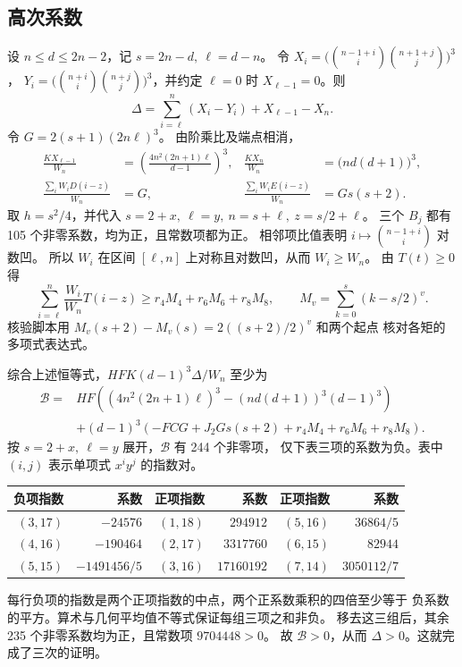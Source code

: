 \documentclass[11pt,UTF8,fontset=fandol]{ctexart}
\begin{document}
\subsection{高次系数}

设 \(n\le d\le 2n-2\)，记 \(s=2n-d,\ \ell=d-n\)。
令 \(X_i=\bigl(\binom{n-1+i}{i}\binom{n+1+j}{j}\bigr)^3\)，
\(Y_i=\bigl(\binom{n+i}{i}\binom{n+j}{j}\bigr)^3\)，并约定
\(\ell=0\) 时 \(X_{\ell-1}=0\)。则
\[
 \Delta=\sum_{i=\ell}^n(X_i-Y_i)+X_{\ell-1}-X_n .
\]
令 \(G=2(s+1)(2n\ell)^3\)。
由阶乘比及端点相消，
\begin{align*}
 \frac{K X_{\ell-1}}{W_n}&=\left(\frac{4n^2(2n+1)\ell}{d-1}\right)^3,&
 \frac{K X_n}{W_n}&=\bigl(nd(d+1)\bigr)^3,\\
 \frac{\sum_i W_iD(i-z)}{W_n}&=G,&
 \frac{\sum_i W_iE(i-z)}{W_n}&=Gs(s+2).
\end{align*}
取 \(h=s^2/4\)，并代入 \(s=2+x,\ \ell=y,\ n=s+\ell,\ z=s/2+\ell\)。
三个 \(B_j\) 都有 105 个非零系数，均为正，且常数项都为正。
相邻项比值表明 \(i\mapsto\binom{n-1+i}{i}\) 对数凹。
所以 \(W_i\) 在区间 \([\ell,n]\) 上对称且对数凹，从而 \(W_i\ge W_n\)。
由 \(T(t)\ge0\) 得
\[
 \sum_{i=\ell}^n \frac{W_i}{W_n}T(i-z)\ge r_4M_4+r_6M_6+r_8M_8,
 \qquad M_v=\sum_{k=0}^s(k-s/2)^v .
\]
核验脚本用 \(M_v(s+2)-M_v(s)=2((s+2)/2)^v\) 和两个起点
核对各矩的多项式表达式。

综合上述恒等式，\(HFK(d-1)^3\Delta/W_n\) 至少为
\begin{align*}
 \mathcal B={}&HF\left((4n^2(2n+1)\ell)^3-(nd(d+1))^3(d-1)^3\right)\\
 &+(d-1)^3\left(-FCG+J_2Gs(s+2)+r_4M_4+r_6M_6+r_8M_8\right).
\end{align*}
按 \(s=2+x,\ \ell=y\) 展开，\(\mathcal B\) 有 244 个非零项，
仅下表三项的系数为负。表中 \((i,j)\) 表示单项式 \(x^iy^j\) 的指数对。

\begin{center}
\begin{tabular}{rrrrrr}
\toprule
负项指数 & 系数 & 正项指数 & 系数 & 正项指数 & 系数\\
\midrule
\((3,17)\)&\(-24576\)&\((1,18)\)&\(294912\)&\((5,16)\)&\(36864/5\)\\
\((4,16)\)&\(-190464\)&\((2,17)\)&\(3317760\)&\((6,15)\)&\(82944\)\\
\((5,15)\)&\(-1491456/5\)&\((3,16)\)&\(17160192\)&\((7,14)\)&\(3050112/7\)\\
\bottomrule
\end{tabular}
\end{center}

每行负项的指数是两个正项指数的中点，两个正系数乘积的四倍至少等于
负系数的平方。算术与几何平均值不等式保证每组三项之和非负。
移去这三组后，其余 235 个非零系数均为正，且常数项 \(9704448>0\)。
故 \(\mathcal B>0\)，从而 \(\Delta>0\)。这就完成了三次的证明。
\end{document}

